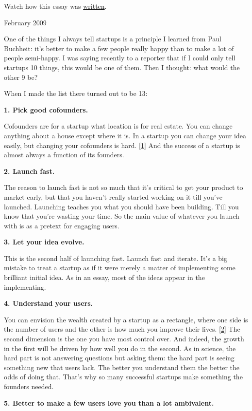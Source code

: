 Watch how this essay was
\href{https://byronm.com/13sentences.html}{written}.

February 2009

One of the things I always tell startups is a principle I learned from
Paul Buchheit: it's better to make a few people really happy than to
make a lot of people semi-happy. I was saying recently to a reporter
that if I could only tell startups 10 things, this would be one of them.
Then I thought: what would the other 9 be?

When I made the list there turned out to be 13:

\textbf{1. Pick good cofounders.}

Cofounders are for a startup what location is for real estate. You can
change anything about a house except where it is. In a startup you can
change your idea easily, but changing your cofounders is hard.
{[}\hyperref[f1n]{1}{]} And the success of a startup is almost always a
function of its founders.

\textbf{2. Launch fast.}

The reason to launch fast is not so much that it's critical to get your
product to market early, but that you haven't really started working on
it till you've launched. Launching teaches you what you should have been
building. Till you know that you're wasting your time. So the main value
of whatever you launch with is as a pretext for engaging users.

\textbf{3. Let your idea evolve.}

This is the second half of launching fast. Launch fast and iterate. It's
a big mistake to treat a startup as if it were merely a matter of
implementing some brilliant initial idea. As in an essay, most of the
ideas appear in the implementing.

\textbf{4. Understand your users.}

You can envision the wealth created by a startup as a rectangle, where
one side is the number of users and the other is how much you improve
their lives. {[}\hyperref[f2n]{2}{]} The second dimension is the one you
have most control over. And indeed, the growth in the first will be
driven by how well you do in the second. As in science, the hard part is
not answering questions but asking them: the hard part is seeing
something new that users lack. The better you understand them the better
the odds of doing that. That's why so many successful startups make
something the founders needed.

\textbf{5. Better to make a few users love you than a lot ambivalent.}

